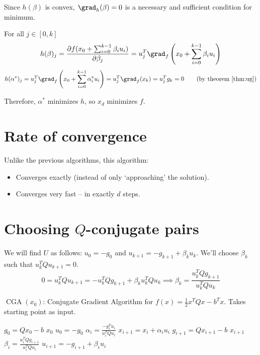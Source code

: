 Since $h(\beta)$ is convex, $\grad_h(\beta) = 0$ is a necessary and sufficient condition for minimum.

For all $j \in [0, k]$
\[ h(\beta)_j = \frac{\partial f(x_0 + \sum_{i=0}^{k-1} \beta_i u_i)}{\partial \beta_j}
= u_j^T \grad_f\left(x_0 + \sum_{i=0}^{k-1} \beta_i u_i \right) \]
\[ h(\alpha^*)_j = u_j^T \grad_f\left(x_0 + \sum_{i=0}^{k-1} \alpha_i^* u_i \right)
= u_j^T \grad_f(x_k) = u_j^Tg_k = 0 \tag{by theorem \ref{thm:ug}} \]

Therefore, $\alpha^*$ minimizes $h$, so $x_d$ minimizes $f$.

\section{Rate of convergence}

Unlike the previous algorithms, this algorithm:
\begin{itemize}
\item Converges exactly (instead of only `approaching' the solution).
\item Converges very fast -- in exactly $d$ steps.
\end{itemize}

\section{Choosing \texorpdfstring{$Q$}{Q}-conjugate pairs}

We will find $U$ as follows:
$u_0 = -g_0$ and $u_{k+1} = -g_{k+1} + \beta_k u_k$.
We'll choose $\beta_k$ such that $u_k^TQu_{k+1} = 0$.
\[ 0 = u_k^TQu_{k+1} = -u_k^TQg_{k+1} + \beta_k u_k^TQu_k
\implies \beta_k = \frac{u_k^TQg_{k+1}}{u_k^TQu_k} \]

\begin{algorithm}[H]
\caption{$\operatorname{CGA}(x_0)$: Conjugate Gradient Algorithm for
$f(x) = \frac{1}{2}x^TQx - b^Tx$. Takes starting point as input.}
\label{alg:conj-grad-for-quadratic}
\begin{algorithmic}[1]
\State $g_0 = Qx_0 - b$
    \State \Return $x_0$
\EndIf
\State $u_0 = -g_0$
\For{$i \in [0, \infty)$}
    \State $\displaystyle \alpha_i = \frac{-g_i^Tu_i}{u_i^TQu_i}$
    \State $x_{i+1} = x_i + \alpha_iu_i$
    \State $g_{i+1} = Qx_{i+1} - b$
        \State \Return $x_{i+1}$
    \EndIf
    \State $\displaystyle \beta_i = \frac{u_i^TQg_{i+1}}{u_i^TQu_i}$
    \State $u_{i+1} = -g_{i+1} + \beta_iu_i$
\EndFor
\end{algorithmic}
\end{algorithm}

